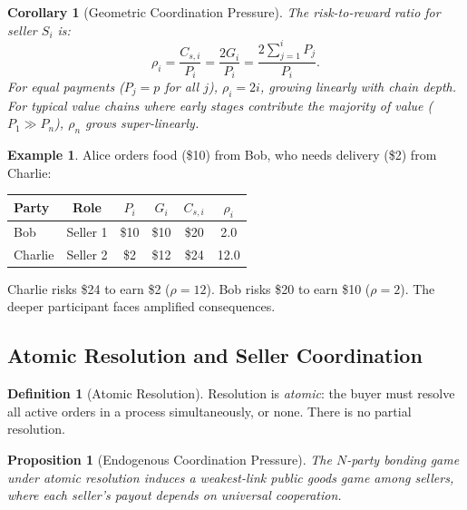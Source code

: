 \documentclass[11pt,a4paper]{article}
\newtheorem{corollary}[theorem]{Corollary}
\newtheorem{proposition}[theorem]{Proposition}
\theoremstyle{definition}
\newtheorem{definition}[theorem]{Definition}
\newtheorem{example}[theorem]{Example}
\theoremstyle{remark}
\newcommand{\pay}{P}           %
\newcommand{\cumval}{G}        %
\begin{document}
\begin{corollary}[Geometric Coordination Pressure]
\label{cor:geometric-pressure}
The risk-to-reward ratio for seller $S_i$ is:
\begin{equation}
  \rho_i = \frac{C_{s,i}}{\pay_i} = \frac{2\cumval_i}{\pay_i}
    = \frac{2\sum_{j=1}^{i} \pay_j}{\pay_i}.
\end{equation}
For equal payments ($\pay_j = p$ for all $j$), $\rho_i = 2i$, growing
linearly with chain depth. For typical value chains where early stages
contribute the majority of value ($\pay_1 \gg \pay_n$), $\rho_n$ grows
super-linearly.
\end{corollary}

\begin{example}
\label{ex:food-delivery}
Alice orders food (\$10) from Bob, who needs delivery (\$2) from
Charlie:
\begin{center}
\begin{tabular}{lccccc}
\toprule
Party & Role & $\pay_i$ & $\cumval_i$ & $C_{s,i}$ & $\rho_i$ \\
\midrule
Bob     & Seller 1 & \$10 & \$10 & \$20 & 2.0 \\
Charlie & Seller 2 & \$2  & \$12 & \$24 & 12.0 \\
\bottomrule
\end{tabular}
\end{center}
Charlie risks \$24 to earn \$2 ($\rho = 12$). Bob risks \$20 to earn
\$10 ($\rho = 2$). The deeper participant faces amplified consequences.
\end{example}

\subsection{Atomic Resolution and Seller Coordination}

\begin{definition}[Atomic Resolution]
\label{def:atomic-resolution}
Resolution is \emph{atomic}: the buyer must resolve all active orders
in a process simultaneously, or none. There is no partial resolution.
\end{definition}

\begin{proposition}[Endogenous Coordination Pressure]
\label{prop:coordination-pressure}
The $N$-party bonding game under atomic resolution induces a
\emph{weakest-link public goods game} among sellers, where each
seller's payout depends on universal cooperation.
\end{proposition}
\end{document}
